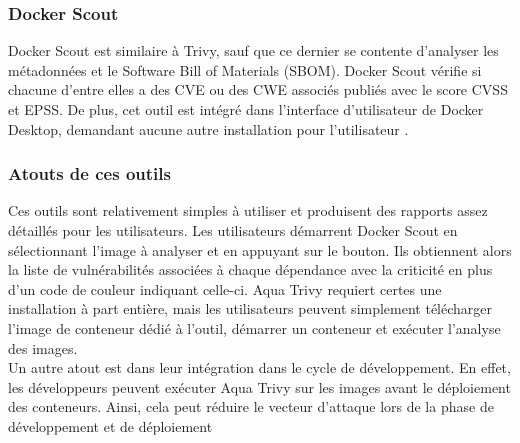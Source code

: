 \subsubsection{Docker Scout}
Docker Scout est similaire à Trivy, sauf que ce dernier se contente d'analyser les métadonnées et le Software Bill of Materials (SBOM). Docker Scout vérifie si chacune d'entre elles a des CVE ou des CWE associés publiés avec le score CVSS et EPSS. De plus, cet outil est intégré dans l'interface d'utilisateur de Docker Desktop, demandant aucune autre installation pour l'utilisateur \cite{docker2026scout}.
\subsubsection{Atouts de ces outils}
Ces outils sont relativement simples à utiliser et produisent des rapports assez détaillés pour les utilisateurs. Les utilisateurs démarrent Docker Scout en sélectionnant l'image à analyser et en appuyant sur le bouton. Ils obtiennent alors la liste de vulnérabilités associées à chaque dépendance avec la criticité en plus d'un code de couleur indiquant celle-ci. Aqua Trivy requiert certes une installation à part entière, mais les utilisateurs peuvent simplement télécharger l'image de conteneur dédié à l'outil, démarrer un conteneur et exécuter l'analyse des images. \\
\newline
Un autre atout est dans leur intégration dans le cycle de développement. En effet, les développeurs peuvent exécuter Aqua Trivy sur les images avant le déploiement des conteneurs. Ainsi, cela peut réduire le vecteur d'attaque lors de la phase de développement et de déploiement
